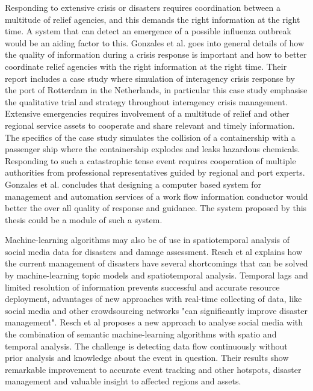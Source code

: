 Responding to extensive crisis or disasters requires coordination between a multitude of relief agencies, and this demands the right information at the right time. A system that can detect an emergence of a possible influenza outbreak would be an aiding factor to this. Gonzales et al. \cite{gonzalez2009framework} goes into general details of how the quality of information during a crisis response is important and how to better coordinate relief agencies with the right information at the right time. Their report includes a case study where simulation of interagency crisis response by the port of Rotterdam in the Netherlands, in particular this case study emphasise the qualitative trial and strategy throughout interagency crisis management. Extensive emergencies requires involvement of a multitude of relief and other regional service assets to cooperate and share relevant and timely information. The specifics of the case study simulates the collision of a containership with a passenger ship where the containership explodes and leaks hazardous chemicals. Responding to such a catastrophic tense event requires cooperation of multiple authorities from professional representatives guided by regional and port experts. Gonzales et al. concludes that designing a computer based system for management and automation services of a work flow information conductor would better the over all quality of response and guidance. The system proposed by this thesis could be a module of such a system. 

Machine-learning algorithms may also be of use in spatiotemporal analysis of social media data for disasters and damage assessment. Resch et al \cite{resch2018combining} explains how the current management of disasters have several shortcomings that can be solved by machine-learning topic models and spatiotemporal analysis. Temporal lags and limited resolution of information prevents successful and accurate resource deployment, advantages of new approaches with real-time collecting of data, like social media and other crowdsourcing networks "can significantly improve disaster management". Resch et al proposes a new approach to analyse social media with the combination of semantic machine-learning algorithms with spatio and temporal analysis. The challenge is detecting data flow continuously without prior analysis and knowledge about the event in question. Their results show remarkable improvement to accurate event tracking and other hotspots, disaster management and valuable insight to affected regions and assets.


